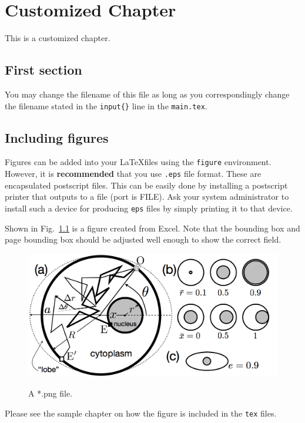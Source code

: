 \chapter{Customized Chapter}

This is a customized chapter.

\section{First section}

\hspace{\parindent} You may change the filename of this file as
long as you correspondingly change the filename stated in the
\verb+input{}+ line in the \verb+main.tex+.

\section{Including figures}

\hspace{\parindent} Figures can be added into your \LaTeX files
using the \verb+figure+ environment.  However, it is
\textbf{recommended} that you use \verb+.eps+ file format.  These
are encapsulated postscript files.  This can be easily done by
installing a postscript printer that outputs to a file (port is
FILE).  Ask your system administrator to install such a device for
producing \verb+eps+ files by simply printing it to that device.

Shown in Fig.~\ref{fig:sampleFig} is a figure created from
Excel\circledR. Note that the bounding box and page bounding box
should be adjusted well enough to show the correct field.
\begin{figure}[h]
  \centering %
  \includegraphics[width=0.8\columnwidth]{figures/model.png}\\
  \caption{
  A *.png file.
  }\label{fig:sampleFig}
\end{figure}

Please see the sample chapter on how the figure is included in the
\verb+tex+ files.
